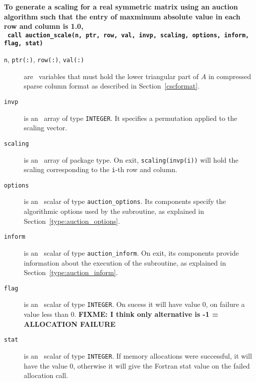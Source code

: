 \textbf{\noindent
   To generate a scaling for a real symmetric matrix using an auction algorithm such that the entry of maxmimum absolute value in each row and column is 1.0,
   \vspace*{0.1cm} \\
   \texttt{ \hspace*{0.2cm}
      call auction\_scale(n, ptr, row, val, invp, scaling, options, inform, flag, stat)
   }
   \vspace{0.3cm}
}

\begin{description}

\item[\texttt{n}, \texttt{ptr(:)}, \texttt{row(:)}, \texttt{val(:)}] are \intentin\ variables that must hold the lower triangular part of $A$ in compressed sparse column format as described in Section~\ref{cscformat}.

\item[\texttt{invp}] is an \intentin\ array of type {\tt INTEGER}. It specifies
a permutation applied to the scaling vector.

\item[\texttt{scaling}] is an \intentout\ array of package type. On exit,
\texttt{scaling(invp(i))} will hold the scaling corresponding to the
\texttt{i}-th row and column.

\item[\texttt{options}] is an \intentin\ scalar of type \texttt{auction\_options}. Its components specify the algorithmic options used by the subroutine, as explained in Section~\ref{type:auction_options}.

\item[\texttt{inform}] is an \intentinout\ scalar of type \texttt{auction\_inform}. On exit, its components provide information about the execution of the subroutine, as explained in Section~\ref{type:auction_inform}.

\item[\texttt{flag}] is an \intentout\ scalar of type {\tt INTEGER}. On sucess it will have value 0, on failure a value less than 0. \textbf{FIXME: I think only alternative is -1 = ALLOCATION FAILURE}

\item[\texttt{stat}] is an \intentout\ scalar of type {\tt INTEGER}. If memory allocations were successful, it will have the value 0, otherwise it will give the
Fortran stat value on the failed allocation call.

\end{description}


